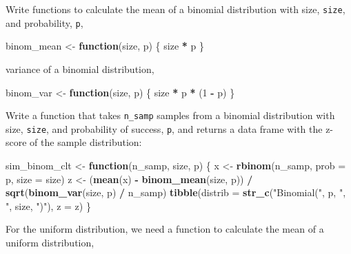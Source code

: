 \documentclass[]{book}
\newenvironment{Shaded}{\begin{snugshade}}{\end{snugshade}}
\newcommand{\KeywordTok}[1]{\textcolor[rgb]{0.13,0.29,0.53}{\textbf{#1}}}
\newcommand{\DataTypeTok}[1]{\textcolor[rgb]{0.13,0.29,0.53}{#1}}
\newcommand{\DecValTok}[1]{\textcolor[rgb]{0.00,0.00,0.81}{#1}}
\newcommand{\StringTok}[1]{\textcolor[rgb]{0.31,0.60,0.02}{#1}}
\newcommand{\ControlFlowTok}[1]{\textcolor[rgb]{0.13,0.29,0.53}{\textbf{#1}}}
\newcommand{\OperatorTok}[1]{\textcolor[rgb]{0.81,0.36,0.00}{\textbf{#1}}}
\newcommand{\NormalTok}[1]{#1}
\theoremstyle{definition}
\theoremstyle{definition}
\theoremstyle{definition}
\theoremstyle{remark}
\begin{document}
Write functions to calculate the mean of a binomial distribution with
size, \texttt{size}, and probability, \texttt{p},

\begin{Shaded}
\begin{Highlighting}[]
\NormalTok{binom_mean <-}\StringTok{ }\ControlFlowTok{function}\NormalTok{(size, p) \{}
\NormalTok{  size }\OperatorTok{*}\StringTok{ }\NormalTok{p}
\NormalTok{\}}
\end{Highlighting}
\end{Shaded}

variance of a binomial distribution,

\begin{Shaded}
\begin{Highlighting}[]
\NormalTok{binom_var <-}\StringTok{ }\ControlFlowTok{function}\NormalTok{(size, p) \{}
\NormalTok{  size }\OperatorTok{*}\StringTok{ }\NormalTok{p }\OperatorTok{*}\StringTok{ }\NormalTok{(}\DecValTok{1} \OperatorTok{-}\StringTok{ }\NormalTok{p)}
\NormalTok{\}}
\end{Highlighting}
\end{Shaded}

Write a function that takes \texttt{n\_samp} samples from a binomial
distribution with size, \texttt{size}, and probability of success,
\texttt{p}, and returns a data frame with the z-score of the sample
distribution:

\begin{Shaded}
\begin{Highlighting}[]
\NormalTok{sim_binom_clt <-}\StringTok{ }\ControlFlowTok{function}\NormalTok{(n_samp, size, p) \{}
\NormalTok{  x <-}\StringTok{ }\KeywordTok{rbinom}\NormalTok{(n_samp, }\DataTypeTok{prob =}\NormalTok{ p, }\DataTypeTok{size =}\NormalTok{ size)}
\NormalTok{  z <-}\StringTok{ }\NormalTok{(}\KeywordTok{mean}\NormalTok{(x) }\OperatorTok{-}\StringTok{ }\KeywordTok{binom_mean}\NormalTok{(size, p)) }\OperatorTok{/}
\StringTok{    }\KeywordTok{sqrt}\NormalTok{(}\KeywordTok{binom_var}\NormalTok{(size, p) }\OperatorTok{/}\StringTok{ }\NormalTok{n_samp)}
  \KeywordTok{tibble}\NormalTok{(}\DataTypeTok{distrib =} \KeywordTok{str_c}\NormalTok{(}\StringTok{"Binomial("}\NormalTok{, p, }\StringTok{", "}\NormalTok{, size, }\StringTok{")"}\NormalTok{),}
         \DataTypeTok{z =}\NormalTok{ z)}
\NormalTok{\}}
\end{Highlighting}
\end{Shaded}

For the uniform distribution, we need a function to calculate the mean
of a uniform distribution,
\end{document}

